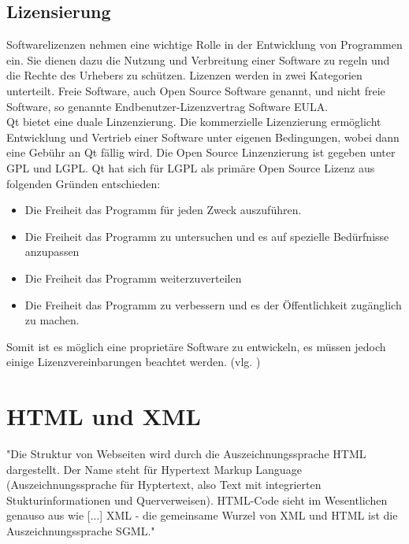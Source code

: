 \subsection{Lizensierung}
Softwarelizenzen nehmen eine wichtige Rolle in der Entwicklung von Programmen ein. Sie dienen dazu die Nutzung und Verbreitung einer Software zu regeln und die Rechte des Urhebers zu schützen. Lizenzen werden in zwei Kategorien unterteilt. Freie Software, auch Open Source Software genannt, und nicht freie Software, so genannte Endbenutzer-Lizenzvertrag Software \ac{EULA}. \\
Qt bietet eine duale Linzenzierung. Die kommerzielle Lizenzierung ermöglicht Entwicklung und Vertrieb einer Software unter eigenen Bedingungen, wobei dann eine Gebühr an Qt fällig wird. Die Open Source Linzenzierung ist gegeben unter \ac{GPL} und \ac{LGPL}. Qt hat sich für \ac{LGPL} als primäre Open Source Lizenz aus folgenden Gründen entschieden:
\begin{itemize}
\item Die Freiheit das Programm für jeden Zweck auszuführen.
\item Die Freiheit das Programm zu untersuchen und es auf spezielle Bedürfnisse anzupassen
\item Die Freiheit das Programm weiterzuverteilen
\item Die Freiheit das Programm zu verbessern und es der Öffentlichkeit zugänglich zu machen.
\end{itemize}
Somit ist es möglich eine proprietäre Software zu entwickeln, es müssen jedoch einige Lizenzvereinbarungen beachtet werden. 
(vlg. \cite{QtLS})
\newpage

\section{HTML und XML}
"Die Struktur von Webseiten wird durch die Auszeichnungssprache \ac{HTML} dargestellt. Der Name steht für Hypertext Markup Language (Auszeichnungssprache für Hyptertext, also Text mit integrierten Stukturinformationen und Querverweisen). HTML-Code sieht im Wesentlichen genauso aus wie [...] \ac{XML} - die gemeinsame Wurzel von \ac{XML} und \ac{HTML} ist die Auszeichnungssprache \ac{SGML}." \cite{SK2008, S.840} 
	
